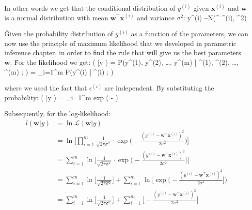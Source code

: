 In other words we get that the conditional distribution of $y^{(i)}$ given $\boldsymbol{x}^{(i)}$ and
$\boldsymbol{w}$ is a normal distribution with mean $\boldsymbol{w}^{\intercal} \boldsymbol{x}^{(i)}$ and variance
$\sigma^2$:
\bse
y^{(i)} \sim N(^{\intercal} ^{(i)}, \sigma^2)
\ese

\v

Given the probability distribution of $y^{(i)}$ as a function of the parameters, we can now use the principle of
maximum likelihood that we developed in parametric inference chapter, in order to find the rule that will give us the
best parameters $\boldsymbol{w}$. \v

For the likelihood we get:
\bse
{} ( |y ) = P(y^{(1)}, y^{(2)}, \ldots, y^{(m)} | ^{(1)}, ^{(2)},
\ldots, ^{(m)} ; ) = \prod_{i=1}^{m} P(y^{(i)} | ^{(i)} ; )
\ese

where we used the fact that $\epsilon^{(i)}$ are independent. \v

By substituting the probability:
\bse
{} ( |y ) = \prod_{i=1}^{m}  \cdot exp \Big( -  \Big)
\ese

Subsequently, for the log-likelihood:
{\setlength{\jot}{10pt}
\begin{align*}
l (\boldsymbol{w} |y ) &= \ln \mathcal{L} (\boldsymbol{w} |y ) \\
&= \ln \Big[ \prod_{i=1}^{m} \frac{1}{\sqrt{2 \pi \sigma^2}} \cdot
\exp \Big( - \frac{(y^{(i)} - \boldsymbol{w}^{\intercal} \boldsymbol{x}^{(i)})^2}{2 \sigma^2} \Big) \Big] \\
&= \sum_{i=1}^{m} \ln \Big[ \frac{1}{\sqrt{2 \pi \sigma^2}} \cdot
\exp \Big( - \frac{(y^{(i)} - \boldsymbol{w}^{\intercal} \boldsymbol{x}^{(i)})^2}{2 \sigma^2} \Big) \Big] \\
&= \sum_{i=1}^{m} \ln \Big[ \frac{1}{\sqrt{2 \pi \sigma^2}} \Big] + \sum_{i=1}^{m}
\ln \Big[ \exp \Big( - \frac{(y^{(i)} - \boldsymbol{w}^{\intercal} \boldsymbol{x}^{(i)})^2}{2 \sigma^2} \Big] \Big) \\
&= \sum_{i=1}^{m} \ln \Big[ \frac{1}{\sqrt{2 \pi \sigma^2}} \Big] +
\sum_{i=1}^{m} \Big[ - \frac{(y^{(i)} - \boldsymbol{w}^{\intercal} \boldsymbol{x}^{(i)})^2}{2 \sigma^2} \Big]
\end{align*}}

